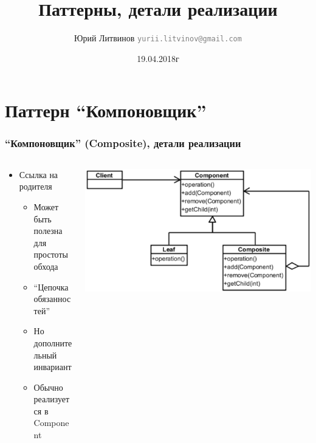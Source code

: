 \documentclass[xetex,mathserif,serif]{beamer}
\title{Паттерны, детали реализации}
\author[Юрий Литвинов]{Юрий Литвинов \newline \textcolor{gray}{\small\texttt{yurii.litvinov@gmail.com}}}
\date{19.04.2018г}
\begin{document}
	
	\frame{\titlepage}

	\section{Паттерн ``Компоновщик''}

	\begin{frame}
		\frametitle{``Компоновщик'' (Composite), детали реализации}
		\begin{columns}
			\begin{column}{0.6\textwidth}
				\begin{itemize}
					\item Ссылка на родителя
					\begin{itemize}
						\item Может быть полезна для простоты обхода
						\item ``Цепочка обязанностей''
						\item Но дополнительный инвариант
						\item Обычно реализуется в Component
					\end{itemize}
				\end{itemize}
			\end{column}
			\begin{column}{0.4\textwidth}
				\begin{center}
					\includegraphics[width=\textwidth]{composite.png}
				\end{center}
			\end{column}
		\end{columns}


\end{frame}
\end{document}
